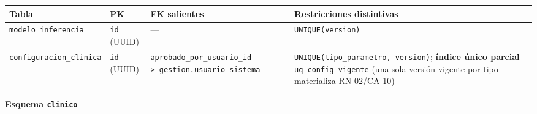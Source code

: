 \documentclass[11pt,a4paper]{article}
\begin{document}
{\small
\begin{longtable}[]{@{}
  >{\raggedright\arraybackslash}p{}
  >{\raggedright\arraybackslash}p{}
  >{\raggedright\arraybackslash}p{}
  >{\raggedright\arraybackslash}p{}@{}}
\toprule\noalign{}
\begin{minipage}[b]{\linewidth}\raggedright
Tabla
\end{minipage} & \begin{minipage}[b]{\linewidth}\raggedright
PK
\end{minipage} & \begin{minipage}[b]{\linewidth}\raggedright
FK salientes
\end{minipage} & \begin{minipage}[b]{\linewidth}\raggedright
Restricciones distintivas
\end{minipage} \\
\midrule\noalign{}
\endhead
\bottomrule\noalign{}
\endlastfoot
\texttt{modelo\_inferencia} & \texttt{id} (UUID) & --- & \texttt{UNIQUE(version)} \\
\texttt{configuracion\_clinica} & \texttt{id} (UUID) & \texttt{aprobado\_por\_usuario\_id\ -\textgreater{}\ gestion.usuario\_sistema} & \texttt{UNIQUE(tipo\_parametro,\ version)}; \textbf{índice único parcial} \texttt{uq\_config\_vigente} (una sola versión vigente por tipo --- materializa RN-02/CA-10) \\
\end{longtable}
}

\textbf{Esquema \texttt{clinico}}
\end{document}
